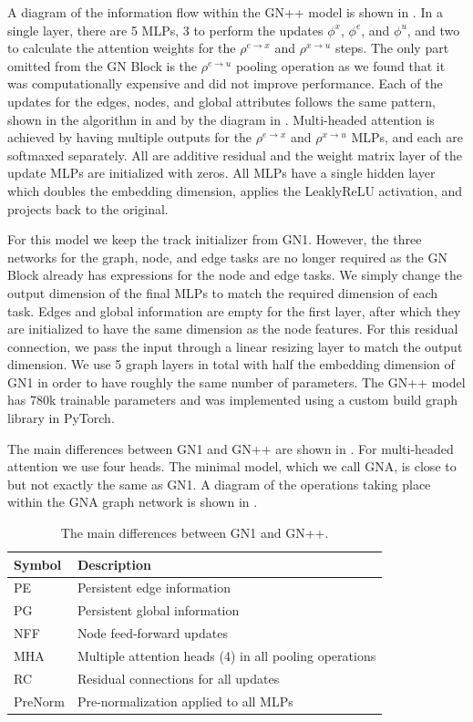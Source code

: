 A diagram of the information flow within the GN++ model is shown in .
In a single layer, there are 5 MLPs, 3 to perform the updates $\phi^x$, $\phi^e$, and $\phi^u$, and two to calculate the attention weights for the $\rho^{e \to x}$ and $\rho^{x \to u}$ steps.
The only part omitted from the GN Block is the $\rho^{e \to u}$ pooling operation as we found that it was computationally expensive and did not improve performance.
Each of the updates for the edges, nodes, and global attributes follows the same pattern, shown in the algorithm in  and by the diagram in .
Multi-headed attention is achieved by having multiple outputs for the $\rho^{e \to x}$ and $\rho^{x \to u}$ MLPs, and each are softmaxed separately.
All are additive residual and the weight matrix layer of the update MLPs are initialized with zeros.
All MLPs have a single hidden layer which doubles the embedding dimension, applies the LeaklyReLU activation, and projects back to the original.

For this model we keep the track initializer from GN1.
However, the three networks for the graph, node, and edge tasks are no longer required as the GN Block already has expressions for the node and edge tasks.
We simply change the output dimension of the final MLPs to match the required dimension of each task.
Edges and global information are empty for the first layer, after which they are initialized to have the same dimension as the node features.
For this residual connection, we pass the input through a linear resizing layer to match the output dimension.
We use 5 graph layers in total with half the embedding dimension of GN1 in order to have roughly the same number of parameters.
The GN++ model has 780k trainable parameters and was implemented using a custom build graph library in PyTorch.

The main differences between GN1 and GN++ are shown in .
For multi-headed attention we use four heads.
The minimal model, which we call GNA, is close to but not exactly the same as GN1.
A diagram of the operations taking place within the GNA graph network is shown in .

\begin{table}
    \centering
    \begin{tabular}{ll}
        \toprule
        \midrule
        Symbol & Description \\
        \midrule
        PE & Persistent edge information \\
        PG & Persistent global information \\
        NFF & Node feed-forward updates \\
        MHA & Multiple attention heads (4) in all pooling operations \\
        RC & Residual connections for all updates \\
        PreNorm & Pre-normalization applied to all MLPs \\
        \bottomrule
    \end{tabular}
    \caption{The main differences between GN1 and GN++.}
    \label{tab:gnpp_grid}
\end{table}

